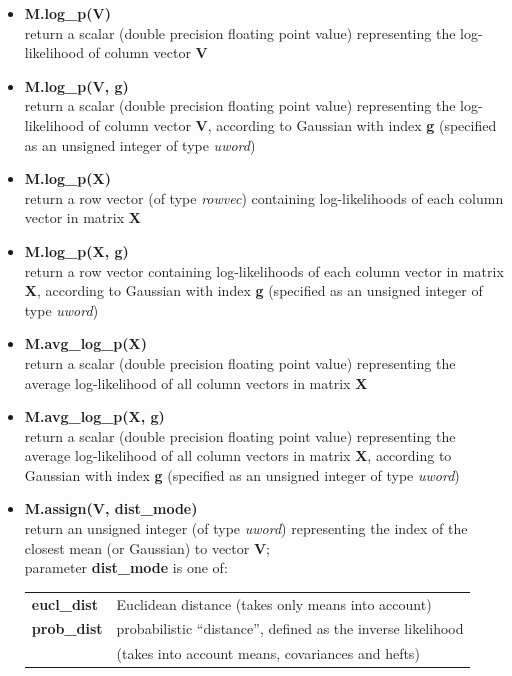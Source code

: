 \begin{small}
\begin{itemize}

\item
{\bf M.log\_p(V)}\\
return a scalar (double precision floating point value) representing the log-likelihood of column vector {\bf V}

\item
{\bf M.log\_p(V, g)}\\
return a scalar (double precision floating point value) representing the log-likelihood of column vector {\bf V},
according to Gaussian with index {\bf g} (specified as an unsigned integer of type {\it uword})

\item
{\bf M.log\_p(X)}\\
return a row vector (of type {\it rowvec}) containing log-likelihoods of each column vector in matrix {\bf X}


\item
{\bf M.log\_p(X, g)}\\
return a row vector containing log-likelihoods of each column vector in matrix {\bf X},
according to Gaussian with index {\bf g}  (specified as an unsigned integer of type {\it uword})

\item
{\bf M.avg\_log\_p(X)}\\
return a scalar (double precision floating point value) representing the average log-likelihood of all column vectors in matrix {\bf X}

\item
{\bf M.avg\_log\_p(X, g)}\\
return a scalar (double precision floating point value) representing the average log-likelihood of all column vectors in matrix {\bf X},
according to Gaussian with index {\bf g}  (specified as an unsigned integer of type {\it uword})

\item
{\bf M.assign(V, dist\_mode)}\\
return an unsigned integer (of type {\it uword}) representing the index of the closest mean (or Gaussian) to vector {\bf V};\\
parameter {\bf dist\_mode} is one of:

\begin{tabular}{ll}
{\bf eucl\_dist} & Euclidean distance (takes only means into account) \\
{\bf prob\_dist} & probabilistic ``distance'', defined as the inverse likelihood\\
                 & (takes into account means, covariances and hefts)
\end{tabular}


\end{itemize}
\end{small}
